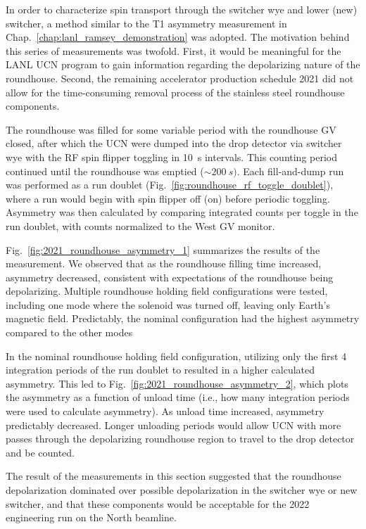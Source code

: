 In order to characterize spin transport through the switcher wye and lower (new) switcher, a method similar to the T1 asymmetry measurement in Chap.~\ref{chap:lanl_ramsey_demonstration} was adopted. The motivation behind this series of measurements was twofold. First, it would be meaningful for the LANL UCN program to gain information regarding the depolarizing nature of the roundhouse. Second, the remaining accelerator production schedule 2021 did not allow for the time-consuming removal process of the stainless steel roundhouse components.

The roundhouse was filled for some variable period with the roundhouse GV closed, after which the UCN were dumped into the drop detector via switcher wye with the RF spin flipper toggling in \qty{10}{s} intervals. This counting period continued until the roundhouse was emptied ($\sim\qty{200}{s})$. Each fill-and-dump run was performed as a run doublet (Fig.~\ref{fig:roundhouse_rf_toggle_doublet}), where a run would begin with spin flipper off (on) before periodic toggling. Asymmetry was then calculated by comparing integrated counts per toggle in the run doublet, with counts normalized to the West GV monitor. 
 
Fig.~\ref{fig:2021_roundhouse_asymmetry_1} summarizes the results of the measurement. We observed that as the roundhouse filling time increased, asymmetry decreased, consistent with expectations of the roundhouse being depolarizing. Multiple roundhouse holding field configurations were tested, including one mode where the solenoid was turned off, leaving only Earth's magnetic field. Predictably, the nominal configuration had the highest asymmetry compared to the other modes

In the nominal roundhouse holding field configuration, utilizing only the first 4 integration periods of the run doublet to resulted in a higher calculated asymmetry. This led to Fig.~\ref{fig:2021_roundhouse_asymmetry_2}, which plots the asymmetry as a function of unload time (i.e., how many integration periods were used to calculate asymmetry). As unload time increased, asymmetry predictably decreased. Longer unloading periods would allow UCN with more passes through the depolarizing roundhouse region to travel to the drop detector and be counted.

The result of the measurements in this section suggested that the roundhouse depolarization dominated over possible depolarization in the switcher wye or new switcher, and that these components would be acceptable for the 2022 engineering run on the North beamline.

